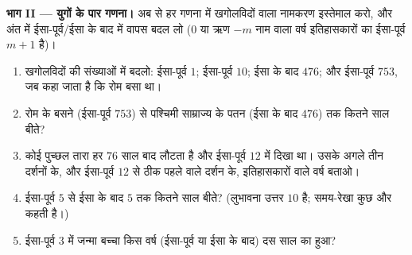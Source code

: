 \begin{problem}
\medskip
\noindent\textbf{भाग II --- युगों के पार गणना।}
अब से हर गणना में खगोलविदों वाला नामकरण इस्तेमाल करो, और अंत में
ईसा-पूर्व/ईसा के बाद में वापस बदल लो ($0$ या ऋण $-m$ नाम वाला
वर्ष इतिहासकारों का ईसा-पूर्व $m + 1$ है)।
\begin{enumerate}[resume]
  \item खगोलविदों की संख्याओं में बदलो: ईसा-पूर्व $1$;
        ईसा-पूर्व $10$; ईसा के बाद $476$; और ईसा-पूर्व $753$,
        जब कहा जाता है कि रोम बसा था।
  \item रोम के बसने (ईसा-पूर्व $753$) से पश्चिमी साम्राज्य के
        पतन (ईसा के बाद $476$) तक कितने साल बीते?
  \item कोई पुच्छल तारा हर $76$ साल बाद लौटता है और ईसा-पूर्व
        $12$ में दिखा था। उसके अगले तीन दर्शनों के, और
        ईसा-पूर्व $12$ से ठीक पहले वाले दर्शन के, इतिहासकारों
        वाले वर्ष बताओ।
  \item ईसा-पूर्व $5$ से ईसा के बाद $5$ तक कितने साल बीते?
        (लुभावना उत्तर $10$ है; समय-रेखा कुछ और कहती है।)
  \item ईसा-पूर्व $3$ में जन्मा बच्चा किस वर्ष (ईसा-पूर्व या
        ईसा के बाद) दस साल का हुआ?
\end{enumerate}


\end{problem}
